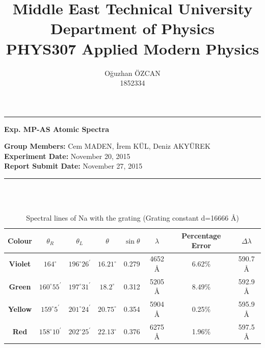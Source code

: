 \documentclass[a4paper,12pt]{article}
\title{Middle East Technical University\\Department of Physics\\\textbf{PHYS307 Applied Modern Physics}}
\author{Oğuzhan ÖZCAN\\1852334}
\date{}
\providecommand{\groupmember}[1]{\textbf{Group Members:} }
\providecommand{\expdate}[1]{\textbf{Experiment Date:} }
\providecommand{\repdate}[1]{\textbf{Report Submit Date:} }
\providecommand{\expname}[1]{\textbf{Exp. MP-AS Atomic Spectra} }
\begin{document}
\maketitle

\thispagestyle{fancy}

\noindent\rule{18.4cm}{0.8pt}
\begin{center}
	\expname{arg1}{}
\end{center}
\groupmember{arg1}{Cem MADEN, İrem KÜL, Deniz AKYÜREK}\\
\expdate{November 6, 2015}{November 20, 2015}\\
\repdate{arg1}{November 27, 2015}\\
\noindent\rule{18.4cm}{0.8pt}\\\\
\begin{table}[h!]

\begin{center}
\begin{tabular}{|c||c|c|c|c|c|c|c|}
	\hline \textbf{Colour}  & $\theta_{R}$ & $\theta_{L}$ &  $\theta$ & $\sin\theta$ & $\lambda$ & Percentage Error & $\Delta\lambda$ \\ 
	\hline \textbf{Violet}  & $164^{\circ}$ & $196^{\circ}26^{\prime}$ & $16.21^{\circ}$ & 0.279 & 4652 \AA & 6.62\% & 590.7 \AA \\ 
	\hline \textbf{Green}  & $160^{\circ}55^{\prime}$ & $197^{\circ}31^{\prime}$ & $18.2^{\circ}$ & 0.312 & 5205 \AA & 8.49\% & 592.9 \AA  \\ 
	\hline \textbf{Yellow} & $159^{\circ}5^{\prime}$ & $201^{\circ}24^{\prime}$ & $20.75^{\circ}$ & 0.354 & 5904 \AA & 0.25\% & 595.9 \AA \\ 
	\hline \textbf{Red} & $158^{\circ}10^{\prime}$ & $202^{\circ}25^{\prime}$ & $22.13^{\circ}$ & 0.376 & 6275 \AA & 1.96\% & 597.5 \AA \\ 
	\hline 
\end{tabular} 
\caption{Spectral lines of Na with the grating (Grating constant d=16666 \AA)}
\end{center}
\end{table}
\end{document}
